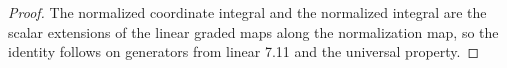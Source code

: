 \begin{proof}


\leanok

The normalized coordinate integral and the normalized integral are the scalar extensions of the linear graded maps along the normalization map, so the identity follows on generators from linear 7.11 and the universal property.

\end{proof}
